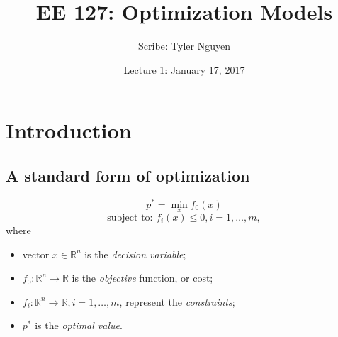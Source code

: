 \documentclass{article}
\begin{document}
\title{EE 127: Optimization Models}
\author{Scribe: Tyler Nguyen}
\date{Lecture 1: January 17, 2017}
\maketitle
\section{Introduction}
\subsection{A standard form of optimization}
\[p^* = \min_x f_0\left(x\right)\]
\[\text{subject to: } f_i\left(x\right) \leq 0, i = 1, \dots, m,\]
where
\begin{itemize}
\item vector \(x \in \mathbb{R}^n\) is the \textit{decision variable};
\item \(f_0: \mathbb{R}^n \rightarrow \mathbb{R}\) is the \textit{objective} function, or cost;
\item \(f_i: \mathbb{R}^n \rightarrow \mathbb{R}, i = 1, \dots, m\), represent the \textit{constraints};
\item \(p^*\) is the \textit{optimal value}.
\end{itemize}
\end{document}
